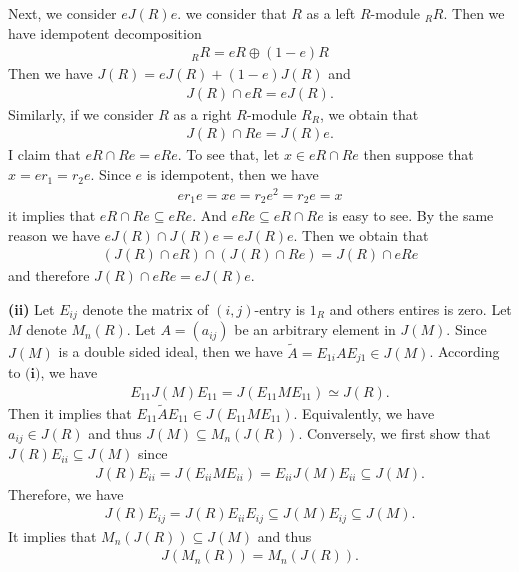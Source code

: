 \begin{solution}
    Next, we consider $eJ(R)e$. we consider that $R$ as a left $R$-module $_R R$. Then we have idempotent decomposition 
    \begin{align*}
        _R R = eR\oplus (1-e)R 
    \end{align*}
    Then we have $J(R) = eJ(R)+(1-e)J(R)$ and 
    \begin{align*}
        J(R)\cap eR = eJ(R). \tag{$\star$}
    \end{align*}
    Similarly, if we consider $R$ as a right $R$-module $R_R$, we obtain that 
    \begin{align*}
        J(R)\cap Re = J(R)e. \tag{$\Delta$}
    \end{align*}
    I claim that $eR\cap Re = eRe$. To see that, let $x\in eR\cap Re $ then suppose that $x= er_1=r_2e$. Since $e$ is idempotent, then we have 
    \begin{align*}
        er_1e =xe = r_2e^2=r_2e = x 
    \end{align*}
    it implies that $eR\cap Re\subseteq eRe$. And $eRe \subseteq eR\cap Re$ is easy to see. 
    By the same reason we have $eJ(R)\cap J(R)e = eJ(R)e$. Then we obtain that 
    \begin{align*}
        (J(R)\cap eR)\cap (J(R)\cap Re) = J(R)\cap eRe
    \end{align*}
    and therefore $J(R)\cap eRe = eJ(R)e$.

    \textbf{(ii)} 
    Let $E_{ij}$ denote the matrix of $(i,j)$-entry is $1_R$ and others entires is zero. 
    Let $M$ denote $M_n(R)$.
    Let $A=(a_{ij})$ be an arbitrary element in $J(M)$. Since $J(M)$ is a double sided ideal, then we have $\tilde{A}=E_{1i}AE_{j1}\in J(M)$.
    According to $\textbf{(i)}$, we have 
    \begin{align*}
        E_{11}J(M)E_{11} = J(E_{11}M E_{11}) \simeq J(R).
    \end{align*}
    Then it implies that $E_{11}\tilde{A}E_{11}\in J(E_{11}M E_{11})$. Equivalently, we have $a_{ij}\in J(R)$ and thus $J(M)\subseteq M_{n}(J(R))$.
    Conversely, we first show that $J(R)E_{ii}\subseteq J(M)$ since 
    \begin{align*}
        J(R)E_{ii}= J(E_{ii} M E_{ii})=E_{ii}J(M)E_{ii} \subseteq J(M).
    \end{align*}
    Therefore, we have 
    \begin{align*}
        J(R)E_{ij} = J(R)E_{ii}E_{ij} \subseteq J(M)E_{ij}\subseteq J(M).
    \end{align*}
    It implies that $M_n(J(R))\subseteq J(M)$ and thus 
    \begin{align*}
        J(M_n(R)) = M_n(J(R)).
    \end{align*}
\end{solution}


